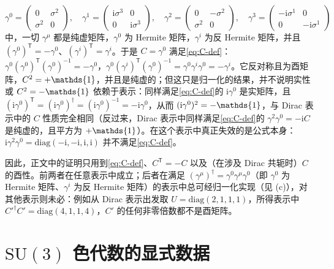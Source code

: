 \documentclass[UTF8,a4paper,11pt,fontset=fandol]{ctexart}
\let\amsmathbb\mathbb
\renewcommand{\mathbb}[1]{\ifx1#1\mathds{1}\else\amsmathbb{#1}\fi}
\theoremstyle{cplain}
\theoremstyle{cdefinition}
\theoremstyle{cremark}
\numberwithin{equation}{section}
\newcommand{\tp}{\mathsf{T}}                         %
\newcommand{\ii}{\mathrm{i}}                        %
\begin{document}
\begin{enumerate}[label=(\alph*)]
\[
\gamma^0=\begin{pmatrix}0&\sigma^2\\ \sigma^2&0\end{pmatrix},\quad
\gamma^1=\begin{pmatrix}\ii\sigma^3&0\\0&\ii\sigma^3\end{pmatrix},\quad
\gamma^2=\begin{pmatrix}0&-\sigma^2\\ \sigma^2&0\end{pmatrix},\quad
\gamma^3=\begin{pmatrix}-\ii\sigma^1&0\\0&-\ii\sigma^1\end{pmatrix}
\]
中，一切 $\gamma^\mu$ 都是纯虚矩阵，$\gamma^0$ 为 Hermite 矩阵，$\gamma^i$ 为反 Hermite 矩阵，并且 $(\gamma^0)^{\tp}=-\gamma^0$、$(\gamma^i)^{\tp}=\gamma^i$。于是 $C=\gamma^0$ 满足\cref{eq:C-def}：$\gamma^0(\gamma^0)^{\tp}(\gamma^0)^{-1}=-\gamma^0$，$\gamma^0(\gamma^i)^{\tp}(\gamma^0)^{-1}=\gamma^0\gamma^i\gamma^0=-\gamma^i$。它反对称且为酉矩阵，$C^2=+\mathbb 1$，并且是纯虚的；但这只是归一化的结果，并不说明实性或 $C^2=-\mathbb 1$ 依赖于表示：同样满足\cref{eq:C-def}的 $\ii\gamma^0$ 是实矩阵，且 $(\ii\gamma^0)^{\tp}=(\ii\gamma^0)^\dagger=(\ii\gamma^0)^{-1}=-\ii\gamma^0$，从而 $(\ii\gamma^0)^2=-\mathbb 1$，与 Dirac 表示中的 $C$ 性质完全相同（反过来，Dirac 表示中同样满足\cref{eq:C-def}的 $\gamma^2\gamma^0=-\ii C$ 是纯虚的，且平方为 $+\mathbb 1$）。在这个表示中真正失效的是公式本身：$\ii\gamma^2\gamma^0=\mathrm{diag}(-\ii,-\ii,\ii,\ii)$ 并不满足\cref{eq:C-def}。
\end{enumerate}
因此，正文中的证明只用到\cref{eq:C-def}、$C^{\tp}=-C$ 以及（在涉及 Dirac 共轭时）$C$ 的酉性。前两者在任意表示中成立；后者在满足 $(\gamma^\mu)^\dagger=\gamma^0\gamma^\mu\gamma^0$（即 $\gamma^0$ 为 Hermite 矩阵、$\gamma^i$ 为反 Hermite 矩阵）的表示中总可经归一化实现（见 (c)），对其他表示则未必：例如从 Dirac 表示出发取 $U=\mathrm{diag}(2,1,1,1)$，所得表示中 $C'^\dagger C'=\mathrm{diag}(4,1,1,4)$，$C'$ 的任何非零倍数都不是酉矩阵。

\section{\texorpdfstring{$\mathrm{SU}(3)$}{SU(3)} 色代数的显式数据}\label{app:su3}
\end{document}
